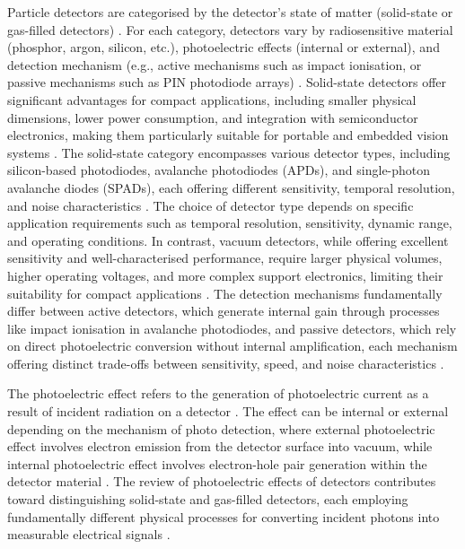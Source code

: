 \documentclass[12pt,a4paper,oneside]{report}
\begin{document}
Particle detectors are categorised by the detector's state of matter (solid-state or gas-filled detectors) \cite{kolanoski2020}. For each category, detectors vary by radiosensitive material (phosphor, argon, silicon, etc.), photoelectric effects (internal or external), and detection mechanism (e.g., active mechanisms such as impact ionisation, or passive mechanisms such as PIN photodiode arrays) \cite{bass2010}. Solid-state detectors offer significant advantages for compact applications, including smaller physical dimensions, lower power consumption, and integration with semiconductor electronics, making them particularly suitable for portable and embedded vision systems \cite{bass2010,piron2020}. The solid-state category encompasses various detector types, including silicon-based photodiodes, avalanche photodiodes (APDs), and single-photon avalanche diodes (SPADs), each offering different sensitivity, temporal resolution, and noise characteristics \cite{piron2020}. The choice of detector type depends on specific application requirements such as temporal resolution, sensitivity, dynamic range, and operating conditions. In contrast, vacuum detectors, while offering excellent sensitivity and well-characterised performance, require larger physical volumes, higher operating voltages, and more complex support electronics, limiting their suitability for compact applications \cite{kolanoski2020}. The detection mechanisms fundamentally differ between active detectors, which generate internal gain through processes like impact ionisation in avalanche photodiodes, and passive detectors, which rely on direct photoelectric conversion without internal amplification, each mechanism offering distinct trade-offs between sensitivity, speed, and noise characteristics \cite{bass2010}.

The photoelectric effect refers to the generation of photoelectric current as a result of incident radiation on a detector \cite{bass2010}. The effect can be internal or external depending on the mechanism of photo detection, where external photoelectric effect involves electron emission from the detector surface into vacuum, while internal photoelectric effect involves electron-hole pair generation within the detector material \cite{bass2010}. The review of photoelectric effects of detectors contributes toward distinguishing solid-state and gas-filled detectors, each employing fundamentally different physical processes for converting incident photons into measurable electrical signals \cite{kolanoski2020,bass2010}.
\end{document}
